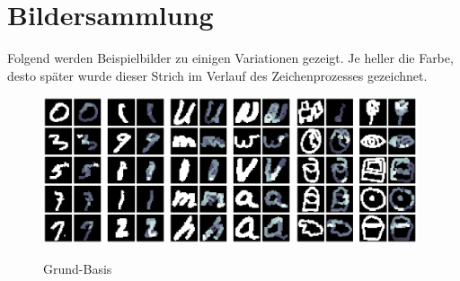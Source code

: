 \section{Bildersammlung}
Folgend werden Beispielbilder zu einigen Variationen gezeigt. Je heller die
Farbe, desto später wurde dieser Strich im Verlauf des Zeichenprozesses
gezeichnet.

\begin{figure}[!ht]
    \centering
    \includegraphics[width=0.32\textwidth]{images/resultate/base-base-mnist.png}
    \includegraphics[width=0.32\textwidth]{images/resultate/base-base-emnist.png}
    \includegraphics[width=0.32\textwidth]{images/resultate/base-base-quickdraw.png}
    \caption{Grund-Basis}
    \label{fig:Grund-Basis}
\end{figure}

